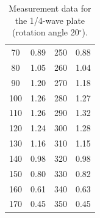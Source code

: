 \documentclass[a4paper]{article}
\begin{document}
\begin{table}[H]
\begin{tabular}{cc||cc}
		70                                                 & 0.89                                            & 250                                & 0.88                                            \\
		80                                                 & 1.05                                            & 260                                & 1.04                                            \\
		90                                                 & 1.20                                            & 270                                & 1.18                                            \\
		100                                                & 1.26                                            & 280                                & 1.27                                            \\
		110                                                & 1.26                                            & 290                                & 1.32                                            \\
		120                                                & 1.24                                            & 300                                & 1.28                                            \\
		130                                                & 1.16                                            & 310                                & 1.15                                            \\
		140                                                & 0.98                                            & 320                                & 0.98                                            \\
		150                                                & 0.80                                            & 330                                & 0.82                                            \\
		160                                                & 0.61                                            & 340                                & 0.63                                            \\
		170                                                & 0.45                                            & 350                                & 0.45                                            \\
		\hline
	\end{tabular}
	\caption{Measurement data for the 1/4-wave plate (rotation angle 20$^\circ$).}
	\label{table::1/4,20}
\end{table}
\end{document}
